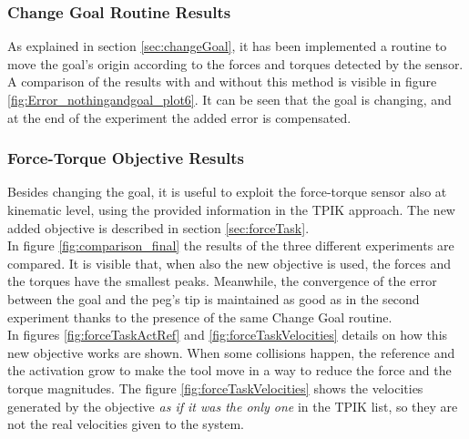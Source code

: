 \subsubsection{Change Goal Routine Results}
As explained in section \ref{sec:changeGoal}, it has been implemented a routine to move the goal's origin according to the forces and torques detected by the sensor. A comparison of the results with and without this method is visible in figure \ref{fig:Error_nothingandgoal_plot6}. It can be seen that the goal is changing, and at the end of the experiment the added error is compensated.

\subsubsection{Force-Torque Objective Results}
Besides changing the goal, it is useful to exploit the force-torque sensor also at kinematic level, using the provided information in the TPIK approach. The new added objective is described in section \ref{sec:forceTask}.\\
In figure \ref{fig:comparison_final} the results of the three different experiments are compared. It is visible that, when also the new objective is used, the forces and the torques have the smallest peaks. Meanwhile, the convergence of the error between the goal and the peg's tip is maintained as good as in the second experiment thanks to the presence of the same Change Goal routine.\\
In figures \ref{fig:forceTaskActRef} and \ref{fig:forceTaskVelocities} details on how this new objective works are shown. When some collisions happen, the reference and the activation grow to make the tool move in a way to reduce the force and the torque magnitudes. The figure \ref{fig:forceTaskVelocities} shows the velocities generated by the objective \textit{as if it was the only one} in the TPIK list, so they are not the real velocities given to the system.

